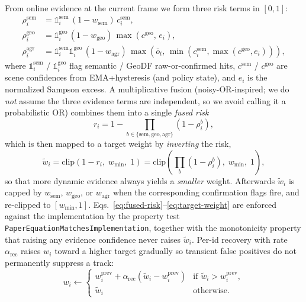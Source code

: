 \documentclass{ieeeaccess}
\begin{document}
From online evidence at the current frame we form three risk terms in \([0,1]\):
\begin{align}
\rho^{\mathrm{sem}}_i &= \mathbb{1}^{\mathrm{sem}}_i\,(1{-}w_{\mathrm{sem}})\,c^{\mathrm{sem}}_i, \\
\rho^{\mathrm{geo}}_i &= \mathbb{1}^{\mathrm{geo}}_i\,(1{-}w_{\mathrm{geo}})\,\max(c^{\mathrm{geo}},\,e_i), \\
\rho^{\mathrm{agr}}_i &= \mathbb{1}^{\mathrm{sem}}_i\mathbb{1}^{\mathrm{geo}}_i\,(1{-}w_{\mathrm{agr}})\,\max(\bar{o}_t,\,\min(c^{\mathrm{sem}}_i,\max(c^{\mathrm{geo}},e_i))),
\end{align}
where \(\mathbb{1}^{\mathrm{sem}}_i\) / \(\mathbb{1}^{\mathrm{geo}}_i\) flag semantic / GeoDF raw-or-confirmed hits, \(c^{\mathrm{sem}}\) / \(c^{\mathrm{geo}}\) are scene confidences from EMA+hysteresis (and policy state), and \(e_i\) is the normalized Sampson excess.
A multiplicative fusion (noisy-OR-inspired; we do \emph{not} assume the three evidence terms are independent, so we avoid calling it a probabilistic OR) combines them into a single \emph{fused risk}
\begin{equation}
\label{eq:fused-risk}
r_i = 1-\!\!\prod_{b\in\{\mathrm{sem},\mathrm{geo},\mathrm{agr}\}}\!\!\left(1-\rho^{b}_i\right),
\end{equation}
which is then mapped to a target weight by \emph{inverting} the risk,
\begin{equation}
\label{eq:target-weight}
\tilde{w}_i = \mathrm{clip}\!\left(1-r_i,\; w_{\min},\;1\right)
            = \mathrm{clip}\!\left(\prod_{b}\left(1-\rho^{b}_i\right),\; w_{\min},\;1\right),
\end{equation}
so that more dynamic evidence always yields a \emph{smaller} weight.
Afterwards \(\tilde{w}_i\) is capped by \(w_{\mathrm{sem}}\), \(w_{\mathrm{geo}}\), or \(w_{\mathrm{agr}}\) when the corresponding confirmation flags fire, and re-clipped to \([w_{\min},1]\).
Eqs.~\eqref{eq:fused-risk}--\eqref{eq:target-weight} are enforced against the implementation by the property test \texttt{PaperEquationMatchesImplementation}, together with the monotonicity property that raising any evidence confidence never raises \(\tilde{w}_i\).
Per-id recovery with rate \(\alpha_{\mathrm{rec}}\) raises \(w_i\) toward a higher target gradually so transient false positives do not permanently suppress a track:
\begin{equation}
w_i \leftarrow
\begin{cases}
w_i^{\mathrm{prev}}+\alpha_{\mathrm{rec}}(\tilde{w}_i-w_i^{\mathrm{prev}}) & \text{if }\tilde{w}_i>w_i^{\mathrm{prev}},\\
\tilde{w}_i & \text{otherwise.}
\end{cases}
\end{equation}
\end{document}
